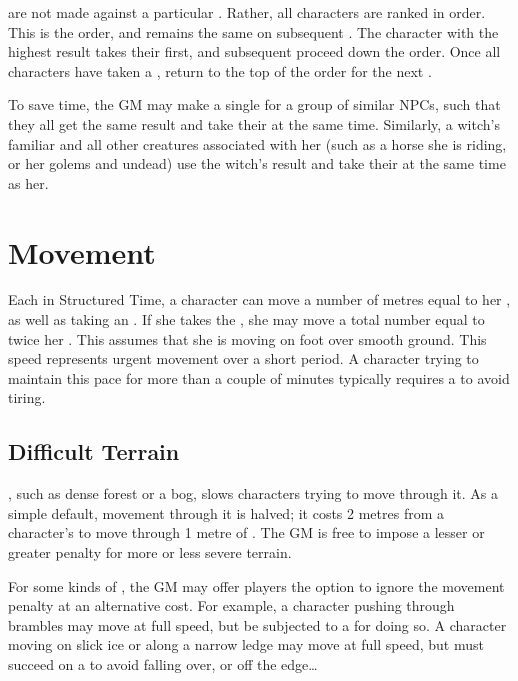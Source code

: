 \capital{\initiative} {\tests} are not made against a particular {\tn}.
Rather, all characters are ranked in order.
This is the {\initiative} order, and remains the same on subsequent {\rounds}.
The character with the highest result takes their {\turn} first, and subsequent {\turns} proceed down the {\initiative} order.
Once all characters have taken a {\turn}, return to the top of the {\initiative} order for the next {\round}.

To save time, the GM may make a single {\test} for a group of similar NPCs, such that they all get the same result and take their {\turns} at the same time.
Similarly, a witch's familiar and all other creatures associated with her (such as a horse she is riding, or her golems and undead) use the witch's {\initiative} result and take their {\turns} at the same time as her.

\section{Movement}

Each {\turn} in Structured Time, a character can move a number of metres equal to her , as well as taking an {\action}.
If she takes the  {\action}, she may move a total number equal to twice her .
This assumes that she is moving on foot over smooth ground.
This speed represents urgent movement over a short period.
A character trying to maintain this pace for more than a couple of minutes typically requires a  {\test} to avoid tiring.



\subsection{Difficult Terrain}

\capital{\difficultterrain}, such as dense forest or a bog, slows characters trying to move through it.
As a simple default, movement through it is halved; it costs 2 metres from a character's  to move through 1 metre of {\difficultterrain}.
The GM is free to impose a lesser or greater penalty for more or less severe terrain.

For some kinds of {\difficultterrain}, the GM may offer players the option to ignore the movement penalty at an alternative cost.
For example, a character pushing through brambles may move at full speed, but be subjected to a {\damagetest} for doing so.
A character moving on slick ice or along a narrow ledge may move at full speed, but must succeed on a  {\test} to avoid falling over, or off the edge{\dots}

